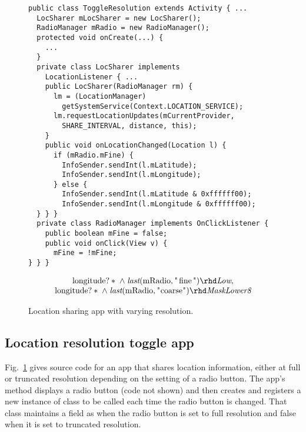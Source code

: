 \documentclass[10pt,conference,compsocconf]{IEEEtran}
\newcommand{\code}[1]{\text{\lstinline!#1!}}
\newcommand{\tlast}[2]{\textit{last}(#1, #2)}
\begin{document}

\begin{figure}[t!]
\begin{lstlisting}[name=Ex]
public class ToggleResolution extends Activity { ...
  LocSharer mLocSharer = new LocSharer();
  RadioManager mRadio = new RadioManager();
  protected void onCreate(...) {
    ...
  }
  private class LocSharer implements
    LocationListener { ... 
    public LocSharer(RadioManager rm) {
      lm = (LocationManager) 
        getSystemService(Context.LOCATION_SERVICE);
      lm.requestLocationUpdates(mCurrentProvider, 
        SHARE_INTERVAL, distance, this);
    }
    public void onLocationChanged(Location l) {
      if (mRadio.mFine) {
        InfoSender.sendInt(l.mLatitude);
        InfoSender.sendInt(l.mLongitude);
      } else {
        InfoSender.sendInt(l.mLatitude & 0xffffff00);
        InfoSender.sendInt(l.mLongitude & 0xffffff00);
  } } }
  private class RadioManager implements OnClickListener {
    public boolean mFine = false;
    public void onClick(View v) {
      mFine = !mFine;
} } }
\end{lstlisting}

\begin{displaymath}
  \begin{array}{c}
    \code{longitude}?\ast \;\wedge\; \tlast{\code{mRadio}}{\code{"fine"}} \rhd
    \textit{Low}, \\
    \code{longitude}?\ast \;\wedge\; \tlast{\code{mRadio}}{\code{"coarse"}} \rhd
    \textit{MaskLower8}
  \end{array}
\end{displaymath}
\caption{Location sharing app with varying resolution.}
\label{fig:app-loc-toggle}
\end{figure}

\subsection{Location resolution toggle app}

Fig.~\ref{fig:app-loc-toggle} gives source code for an app that
shares location information, either at full or truncated resolution
depending on the setting of a radio button. The app's \code{onCreate}
method displays a radio button (code not shown) and then creates and
registers a new instance of class \code{RadioManager} to be called
each time the radio button is changed. That
class maintains a field \code{mFine} as \code{true} when the radio button is
set to full resolution and false when it is set to truncated
resolution.
\end{document}
